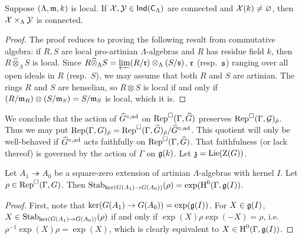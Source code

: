 \begin{theorem}
Suppose $(\Lambda,\mathfrak{m},k)$ is local. If $\mathcal{X},\mathcal{Y}\in \operatorname{\mathsf{Ind}}(\mathsf{C}_\Lambda)$ are 
connected and $\mathcal{X}(k)\ne\varnothing$, then $\mathcal{X}\times_\Lambda \mathcal{Y}$ is 
connected. 
\end{theorem}
\begin{proof}
The proof reduces to proving the following result from commutative algebra: if 
$R,S$ are local pro-artinian $\Lambda$-algebras and $R$ has residue field 
$k$, then $R\widehat\otimes_\Lambda S$ is local. Since 
$R\widehat\otimes_\Lambda S = \varprojlim (R/\mathfrak{r})\otimes_\Lambda (S/\mathfrak{s})$, 
$\mathfrak{r}$ (resp.~$\mathfrak{s}$) ranging over all open ideals in $R$ (resp.~$S$), we may 
assume that both $R$ and $S$ are artinian. The rings $R$ and $S$ are 
henselian, so $R\otimes S$ is local if and only if 
$(R/\mathfrak{m}_R)\otimes (S/\mathfrak{m}_S) = S/\mathfrak{m}_S$ is local, which it is. 
\end{proof}

We conclude that the action of $\widehat G^{\circ,\mathrm{ad}}$ on 
$\operatorname{Rep}^\square(\Gamma,\widehat G)$ 
preserves $\operatorname{Rep}^\square(\Gamma,\mathcal{G})_{\bar\rho}$. Thus we may put 
$\operatorname{Rep}(\Gamma,G)_{\bar\rho} = \operatorname{Rep}^\square(\Gamma,\widehat G)_{\bar\rho} / \widehat G^{\circ,\mathrm{ad}}$. 
This quotient will only be well-behaved if $\widehat G^{\circ,\mathrm{ad}}$ 
acts faithfully on $\operatorname{Rep}^\square(\Gamma,\widehat G)$. That faithfulness (or 
lack thereof) is governed by the action of $\Gamma$ on $\mathfrak{g}(k)$. Let 
$\mathfrak{z} = \operatorname{Lie}(\operatorname{Z}(G))$. 

\begin{lemma}\label{lem:stab=H0}
Let $A_1 \twoheadrightarrow A_0$ be a square-zero extension of artinian 
$\Lambda$-algebras with kernel $I$. Let $\rho\in \operatorname{Rep}^\square(\Gamma,G)$. 
Then $\operatorname{Stab}_{\ker(G(A_1) \to G(A_0))}(\rho) = \exp(\operatorname{H}^0(\Gamma,\mathfrak{g}(I))$. 
\end{lemma}
\begin{proof}
First, note that $\ker(G(A_1) \to G(A_0)) = \exp(\mathfrak{g}(I))$. For $X\in \mathfrak{g}(I)$, 
$X\in \operatorname{Stab}_{\ker(G(A_1) \to G(A_0))}(\rho)$ if and only if 
$\exp(X) \rho \exp(-X) = \rho$, i.e.~$\rho^{-1} \exp(X) \rho = \exp(X)$, 
which is clearly equivalent to $X\in \operatorname{H}^0(\Gamma,\mathfrak{g}(I))$. 
\end{proof}

